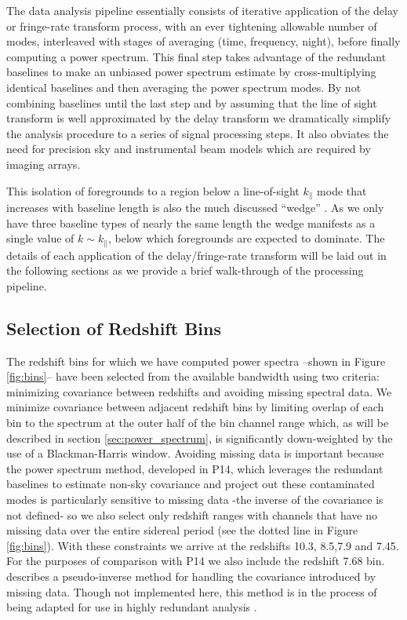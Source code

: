 \documentclass[preprint2]{aastex}
\begin{document}
The data analysis pipeline essentially consists of iterative application of the delay or fringe-rate transform process, with an ever tightening allowable number of modes, interleaved with stages of averaging (time, frequency, night), before finally computing a power spectrum.  This final step takes advantage of the redundant baselines to make an unbiased power spectrum estimate by cross-multiplying identical baselines and then averaging the power spectrum modes. By not combining baselines until the last step and by assuming that the line of sight transform is well approximated by the delay transform we dramatically simplify the analysis procedure to a series of signal processing steps. It also obviates the need for precision sky and instrumental beam models which are required by imaging arrays.  

This isolation of foregrounds to a region below a line-of-sight $k_\parallel$ mode that increases with baseline length is also the much discussed ``wedge'' \citep{PhysRevD.90.023018,PhysRevD.90.023019,Thyagarajan:2013p10039,Pober:2013p9942,Trott:2012p10466,Morales:2012p8790,Parsons:2012p8896,Vedantham:2012p10297,Datta:2010p8781,Parsons:2009p7859}. As we only have three baseline types of nearly the same length the wedge manifests as a single value of $k\sim k_\parallel$, below which foregrounds are expected to dominate.  The details of each application of the delay/fringe-rate transform will be laid out in the following sections as we provide a brief walk-through of the processing pipeline. 


\subsection{Selection of Redshift Bins}
The redshift bins for which we have computed power spectra --shown in Figure \ref{fig:bins}-- have been selected from the available bandwidth using two criteria: minimizing covariance between redshifts and avoiding missing spectral data. We minimize covariance between adjacent redshift bins by limiting overlap of each bin to the spectrum at the outer half of the bin channel range which, as will be described in section \ref{sec:power_spectrum}, is significantly down-weighted by the use of a Blackman-Harris window.   Avoiding missing data is important because the power spectrum method, developed in P14, which leverages the redundant baselines to estimate non-sky covariance and project out these contaminated modes is particularly sensitive to missing data -the inverse of the covariance is not defined- so we also select only redshift ranges with channels that have no missing data over the entire sidereal period (see the dotted line in Figure \ref{fig:bins}).  With these constraints we arrive at the redshifts 10.3, 8.5,7.9 and 7.45.  For the purposes of comparison with P14 we also include the redshift 7.68 bin.  \citet{Dillon:2013p10497} describes a pseudo-inverse method for handling the covariance introduced by missing data. Though not implemented here, this method is in the process of being adapted for use in highly redundant analysis \citep{PhysRevD.90.023018,PhysRevD.90.023019}.  
\end{document}
